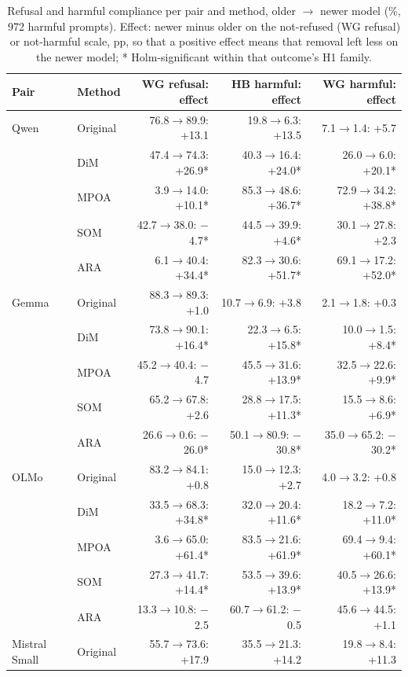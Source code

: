 \begin{table}[t]
\centering\scriptsize
\setlength{\tabcolsep}{2.5pt}
\caption{Refusal and harmful compliance per pair and method, older $\to$ newer model (\%, 972 harmful prompts). Effect:
newer minus older on the not-refused (WG refusal) or not-harmful scale, pp, so that a positive effect means that
removal left less on the newer model; * Holm-significant within that outcome's H1 family.}
\label{tab:harm-cells}
\begin{tabular}{@{}llrrr@{}}
\toprule
Pair & Method & WG refusal: effect & HB harmful: effect & WG harmful: effect \\
\midrule
Qwen & Original & 76.8$\to$89.9: +13.1 & 19.8$\to$6.3: +13.5 & 7.1$\to$1.4: +5.7 \\
 & DiM & 47.4$\to$74.3: +26.9* & 40.3$\to$16.4: +24.0* & 26.0$\to$6.0: +20.1* \\
 & MPOA & 3.9$\to$14.0: +10.1* & 85.3$\to$48.6: +36.7* & 72.9$\to$34.2: +38.8* \\
 & SOM & 42.7$\to$38.0: $-$4.7* & 44.5$\to$39.9: +4.6* & 30.1$\to$27.8: +2.3 \\
 & ARA & 6.1$\to$40.4: +34.4* & 82.3$\to$30.6: +51.7* & 69.1$\to$17.2: +52.0* \\
\midrule
Gemma & Original & 88.3$\to$89.3: +1.0 & 10.7$\to$6.9: +3.8 & 2.1$\to$1.8: +0.3 \\
 & DiM & 73.8$\to$90.1: +16.4* & 22.3$\to$6.5: +15.8* & 10.0$\to$1.5: +8.4* \\
 & MPOA & 45.2$\to$40.4: $-$4.7 & 45.5$\to$31.6: +13.9* & 32.5$\to$22.6: +9.9* \\
 & SOM & 65.2$\to$67.8: +2.6 & 28.8$\to$17.5: +11.3* & 15.5$\to$8.6: +6.9* \\
 & ARA & 26.6$\to$0.6: $-$26.0* & 50.1$\to$80.9: $-$30.8* & 35.0$\to$65.2: $-$30.2* \\
\midrule
OLMo & Original & 83.2$\to$84.1: +0.8 & 15.0$\to$12.3: +2.7 & 4.0$\to$3.2: +0.8 \\
 & DiM & 33.5$\to$68.3: +34.8* & 32.0$\to$20.4: +11.6* & 18.2$\to$7.2: +11.0* \\
 & MPOA & 3.6$\to$65.0: +61.4* & 83.5$\to$21.6: +61.9* & 69.4$\to$9.4: +60.1* \\
 & SOM & 27.3$\to$41.7: +14.4* & 53.5$\to$39.6: +13.9* & 40.5$\to$26.6: +13.9* \\
 & ARA & 13.3$\to$10.8: $-$2.5 & 60.7$\to$61.2: $-$0.5 & 45.6$\to$44.5: +1.1 \\
\midrule
Mistral Small & Original & 55.7$\to$73.6: +17.9 & 35.5$\to$21.3: +14.2 & 19.8$\to$8.4: +11.3 \\

\end{tabular}
\end{table}
